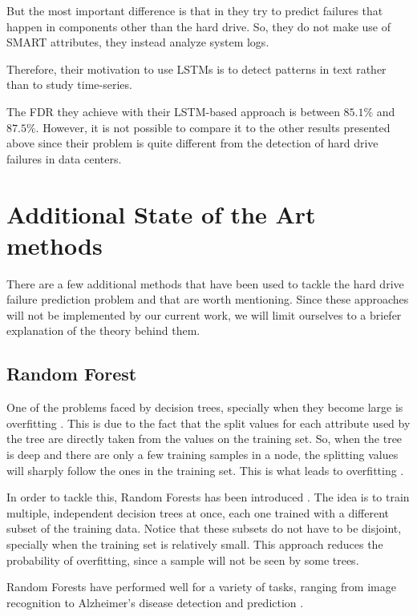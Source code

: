 But the most important difference is that in \cite{das2018desh} they try to predict failures that happen in components other than the hard drive.
So, they do not make use of SMART attributes, they instead analyze system logs.

Therefore, their motivation to use LSTMs is to detect patterns in text rather than to study time-series.

The FDR they achieve with their LSTM-based approach is between $85.1\%$ and $87.5\%$.
However, it is not possible to compare it to the other results presented above since their problem is quite different from the detection of hard drive failures in data centers.

\section{Additional State of the Art methods}

There are a few additional methods that have been used to tackle the hard drive failure prediction problem and that are worth mentioning.
Since these approaches will not be implemented by our current work, we will limit ourselves to a briefer explanation of the theory behind them.

\subsection{Random Forest}\label{subsec:randomforest}

One of the problems faced by decision trees, specially when they become large is overfitting \cite{ying2019overview}.
This is due to the fact that the split values for each attribute used by the tree are directly taken from the values on the training set.
So, when the tree is deep and there are only a few training samples in a node, the splitting values will sharply follow the ones in the training set.
This is what leads to overfitting \cite{Bramer2020}.

In order to tackle this, Random Forests has been introduced \cite{ho1995random}.
The idea is to train multiple, independent decision trees at once, each one trained with a different subset of the training data.
Notice that these subsets do not have to be disjoint, specially when the training set is relatively small.
This approach reduces the probability of overfitting, since a sample will not be seen by some trees.

Random Forests have performed well for a variety of tasks, ranging from image recognition to Alzheimer's disease detection and prediction \cite{shaik2019brief}.

